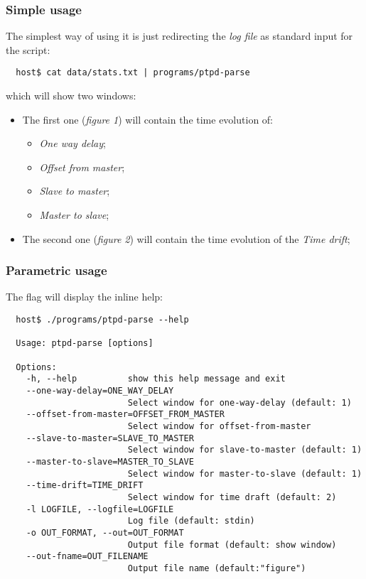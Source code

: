         \subsubsection{Simple usage}

            The simplest way of using it is just redirecting the \emph{log
            file} as standard input for the script:
\begin{lstlisting}
  host$ cat data/stats.txt | programs/ptpd-parse
\end{lstlisting}
            which will show two windows:
            \begin{itemize}
            \item   The first one (\emph{figure 1}) will contain the time
                    evolution of:
                \begin{itemize}
                \item   \emph{One way delay};
                \item   \emph{Offset from master};
                \item   \emph{Slave to master};
                \item   \emph{Master to slave};
                \end{itemize}
            \item   The second one (\emph{figure 2}) will contain the time
                    evolution of the \emph{Time drift};
            \end{itemize}

        \subsubsection{Parametric usage}

            The  flag will display the inline help:
\begin{lstlisting}
  host$ ./programs/ptpd-parse --help

  Usage: ptpd-parse [options]

  Options:
    -h, --help          show this help message and exit
    --one-way-delay=ONE_WAY_DELAY
                        Select window for one-way-delay (default: 1)
    --offset-from-master=OFFSET_FROM_MASTER
                        Select window for offset-from-master
    --slave-to-master=SLAVE_TO_MASTER
                        Select window for slave-to-master (default: 1)
    --master-to-slave=MASTER_TO_SLAVE
                        Select window for master-to-slave (default: 1)
    --time-drift=TIME_DRIFT
                        Select window for time draft (default: 2)
    -l LOGFILE, --logfile=LOGFILE
                        Log file (default: stdin)
    -o OUT_FORMAT, --out=OUT_FORMAT
                        Output file format (default: show window)
    --out-fname=OUT_FILENAME
                        Output file name (default:"figure")
\end{lstlisting}


